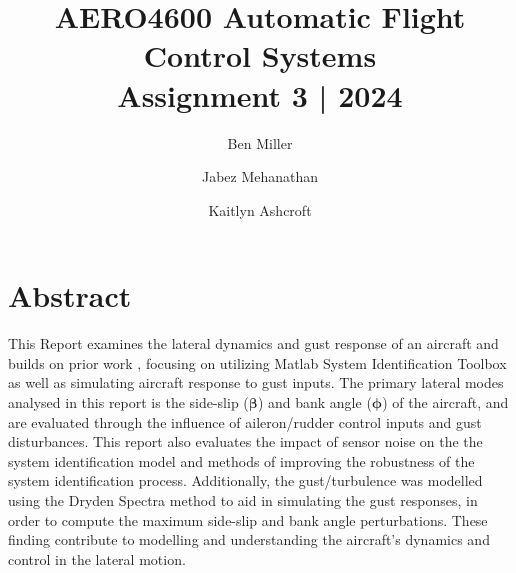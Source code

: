 \documentclass{UoNMCHA}
\numberwithin{equation}{section}
\begin{document}
\title{AERO4600 Automatic Flight Control Systems\\
{\small Assignment 3 | 2024}}

\author[UoNMCHA]{Ben Miller}
\address[UoNMCHA]{
Student of Aerospace Systems Engineering,\\
The University of Newcastle, Callaghan, NSW 2308, AUSTRALIA \\
Student Number: C3328484 \\
E-mail: \href{mailto:First.Last@uon.edu.au}{\textsf{c3328484@uon.edu.au}}}

\author[UoNMCHA]{Jabez Mehanathan}
\address[UoNMCHA]{
Student of Aerospace Systems Engineering,\\
The University of Newcastle, Callaghan, NSW 2308, AUSTRALIA \\
Student Number:  \\
E-mail: \href{mailto:First.Last@uon.edu.au}{\textsf{}}}

\author[UoNMCHA]{Kaitlyn Ashcroft}
\address[UoNMCHA]{
Student of Aerospace Systems Engineering,\\
The University of Newcastle, Callaghan, NSW 2308, AUSTRALIA \\
Student Number: C3350754  \\
E-mail: \href{mailto:First.Last@uon.edu.au}{\textsf{}}}
\maketitle
\onecolumn

\vspace{-5mm}
\section*{Abstract}
\vspace{-3mm}
This Report examines the lateral dynamics and gust response of an aircraft and builds on prior work  \cite{A1-Report}, focusing on utilizing Matlab System Identification Toolbox as well as simulating aircraft response to gust inputs. The primary lateral modes analysed in this report is the side-slip ($\boldsymbol{\beta}$) and bank angle ($\boldsymbol{\phi}$) of the aircraft, and are evaluated through the influence of aileron/rudder control inputs and gust disturbances. This report also evaluates the impact of sensor noise on the the system identification model and methods of improving the robustness of the system identification process. Additionally, the gust/turbulence was modelled using the Dryden Spectra method to aid in simulating the gust responses, in order to compute the maximum side-slip and bank angle perturbations. These finding contribute to modelling and understanding the aircraft's dynamics and control in the lateral motion. 
\end{document}
